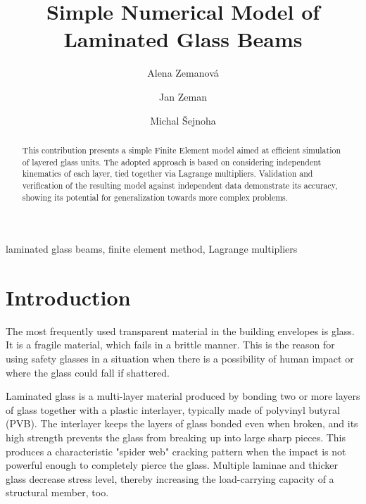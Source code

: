 \documentclass[times,a4paper,12pt]{elsarticle}
\begin{document}
\begin{frontmatter}

\title{Simple Numerical Model of Laminated Glass Beams} 

\author[mech]{Alena Zemanov\'{a}}
\author[mech]{Jan Zeman}
\author[mech,cideas]{Michal \v{S}ejnoha}

\address[mech]{Department of Mechanics, Faculty of Civil Engineering, Czech Technical
University in Prague, Th\' akurova 7, 166 29 Prague 6, Czech Republic}

\address[cideas]{Centre for Integrated Design of Advances Structures, Th\' akurova 7,\\
166 29 Prague~6, Czech Republic}

\begin{abstract}
This contribution presents a simple Finite Element model aimed at
efficient simulation of layered glass units. The adopted approach is
based on considering independent kinematics of each layer, tied
together via Lagrange multipliers. Validation and verification of the
resulting model against independent data demonstrate its accuracy,
showing its potential for generalization towards more complex
problems.
\end{abstract}

\begin{keyword}
laminated glass beams, finite element method, Lagrange multipliers
\end{keyword}

\end{frontmatter}

\section{Introduction}\label{sec:intro}
The most frequently used transparent material in the building
envelopes is glass. It is a fragile material, which fails in a brittle
manner. This is the reason for using safety glasses in a situation
when there is a possibility of human impact or where the glass could
fall if shattered.

Laminated glass is a multi-layer material produced by bonding two or
more layers of glass together with a plastic interlayer, typically
made of polyvinyl butyral (PVB). The interlayer keeps the layers of
glass bonded even when broken, and its high strength prevents the
glass from breaking up into large sharp pieces. This produces a
characteristic "spider web" cracking pattern when the impact is not
powerful enough to completely pierce the glass. Multiple laminae and
thicker glass decrease stress level,
  thereby increasing the load-carrying capacity of a structural
member, too.
\end{document}
